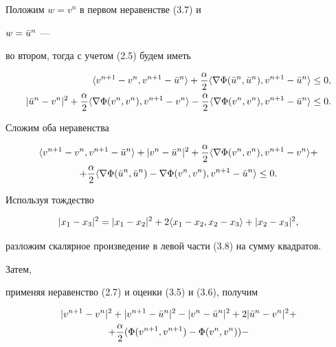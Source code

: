 \begin{pf} Положим $w=v^n$ в первом неравенстве (3.7) и


$w=\Bar u^n$ ---


во втором, тогда с учетом (2.5) будем иметь


\begin{align*}


\la v^{n+1}-v^n,v^{n+1}-\Bar u^n\ra+\frac{\alpha}{2}


\la\nabla\Phi(\Bar u^n,\Bar u^n),v^{n+1}-\Bar u^n\ra & \le 0,\\


|\Bar u^n-v^n|^2+\frac{\alpha}{2}\la\nabla\Phi(v^n,v^n),v^{n+1}-v^n\ra


-\frac{\alpha}{2}\la\nabla\Phi(v^n,v^n),v^{n+1}-\Bar u^n\ra &\le 0.


\end{align*}


Сложим оба неравенства


\begin{multline}


\la v^{n+1}-v^n,v^{n+1}-\Bar u^n\ra+|v^n-\Bar u^n|^2+


\frac{\alpha}{2}\la\nabla\Phi(v^n,v^n),v^{n+1}-v^n\ra+ \\


+\frac{\alpha}{2}\la\nabla\Phi(\Bar u^n,\Bar u^n)-\nabla\Phi(v^n,v^n),


v^{n+1}-\Bar u^n\ra \le 0.


\end{multline}


Используя тождество


\begin{equation}


|x_1-x_3|^2=|x_1-x_2|^2+2\la x_1-x_2,x_2-x_3\ra+


|x_2-x_3|^2,


\end{equation}


разложим скалярное произведение в левой части (3.8) на сумму квадратов.


Затем,


применяя неравенство (2.7) и оценки (3.5) и (3.6), получим


\begin{multline*}


|v^{n+1}-v^n|^2+|v^{n+1}-\Bar u^n|^2-|v^n-\Bar u^n|^2+


2|\Bar u^n-v^n|^2+\\


+\frac{\alpha}{2}(\Phi(v^{n+1},v^{n+1})-\Phi(v^n,v^n))-



\end{multline*}
\end{pf}
